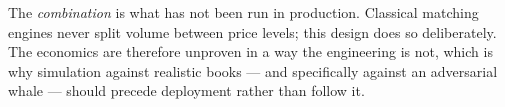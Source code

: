 \documentclass[11pt]{article}
\begin{document}
The \emph{combination} is what has not been run in production. Classical matching engines
never split volume between price levels; this design does so deliberately. The economics are
therefore unproven in a way the engineering is not, which is why simulation against realistic
books — and specifically against an adversarial whale — should precede deployment rather than
follow it.

\vspace{1.2em}
\noindent{\color{rulec}\rule{\linewidth}{0.6pt}}
\vspace{0.4em}

\end{document}
